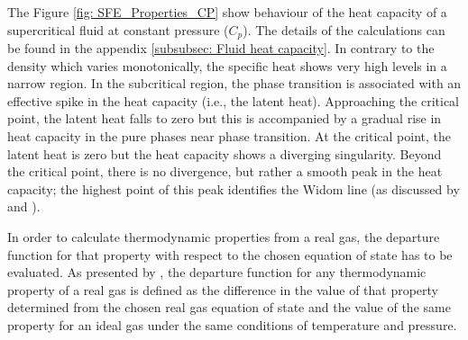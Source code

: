 \documentclass[../Article_Design_of_Experiment.tex]{subfiles}
\begin{document}
    The Figure \ref{fig: SFE_Properties_CP} show behaviour of the heat capacity of a supercritical fluid at constant pressure ($C_p$). The details of the calculations can be found in the appendix \ref{subsubsec: Fluid heat capacity}. In contrary to the density which varies monotonically, the specific heat shows very high levels in a narrow region. In the subcritical region, the phase transition is associated with an effective spike in the heat capacity (i.e., the latent heat). Approaching the critical point, the latent heat falls to zero but this is accompanied by a gradual rise in heat capacity in the pure phases near phase transition. At the critical point, the latent heat is zero but the heat capacity shows a diverging singularity. Beyond the critical point, there is no divergence, but rather a smooth peak in the heat capacity; the highest point of this peak identifies the Widom line (as discussed by \citet{Simeoni2010} and \citet{Banuti2019}).

    In order to calculate thermodynamic properties from a real gas, the departure function for that property with respect to the chosen equation of state has to be evaluated. As presented by \citet{Elliott2011}, the departure function for any thermodynamic property of a real gas is defined as the difference in the value of that property determined from the chosen real gas equation of state and the value of the same property for an ideal gas under the same conditions of temperature and pressure. %

			
			
\end{document}
